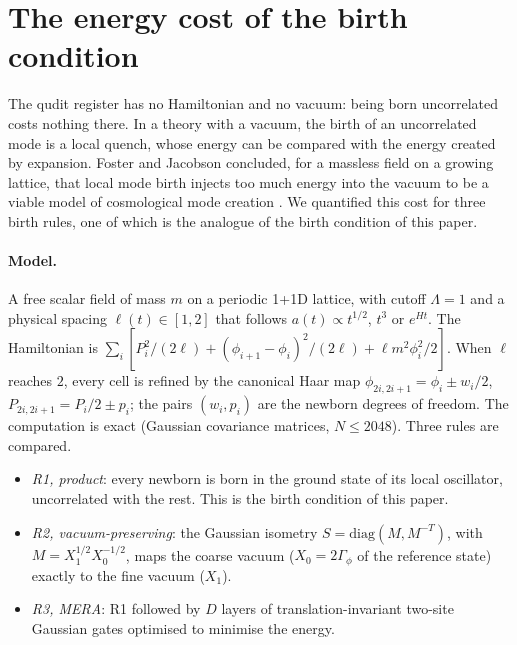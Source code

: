 \section{The energy cost of the birth condition}\label{sec:energy}

The qudit register has no Hamiltonian and no vacuum: being born uncorrelated costs nothing there. In a theory with a vacuum, the birth of an uncorrelated mode is a local quench, whose energy can be compared with the energy created by expansion. Foster and Jacobson concluded, for a massless field on a growing lattice, that local mode birth injects too much energy into the vacuum to be a viable model of cosmological mode creation \cite{FosterJacobson2004}. We quantified this cost for three birth rules, one of which is the analogue of the birth condition of this paper.

\paragraph{Model.} A free scalar field of mass $m$ on a periodic 1+1D lattice, with cutoff $\Lambda=1$ and a physical spacing $\ell(t)\in[1,2]$ that follows $a(t)\propto t^{1/2}$, $t^3$ or $e^{Ht}$. The Hamiltonian is $\sum_i[P_i^2/(2\ell)+(\phi_{i+1}-\phi_i)^2/(2\ell)+\ell m^2\phi_i^2/2]$. When $\ell$ reaches $2$, every cell is refined by the canonical Haar map $\phi_{2i,2i+1}=\phi_i\pm w_i/2$, $P_{2i,2i+1}=P_i/2\pm p_i$; the pairs $(w_i,p_i)$ are the newborn degrees of freedom. The computation is exact (Gaussian covariance matrices, $N\le2048$). Three rules are compared.
\begin{itemize}[leftmargin=*,itemsep=1pt]
\item \emph{R1, product}: every newborn is born in the ground state of its local oscillator, uncorrelated with the rest. This is the birth condition of this paper.
\item \emph{R2, vacuum-preserving}: the Gaussian isometry $S=\mathrm{diag}(M,M^{-T})$, with $M=X_1^{1/2}X_0^{-1/2}$, maps the coarse vacuum ($X_0=2\Gamma_\phi$ of the reference state) exactly to the fine vacuum ($X_1$).
\item \emph{R3, MERA}: R1 followed by $D$ layers of translation-invariant two-site Gaussian gates optimised to minimise the energy.
\end{itemize}

